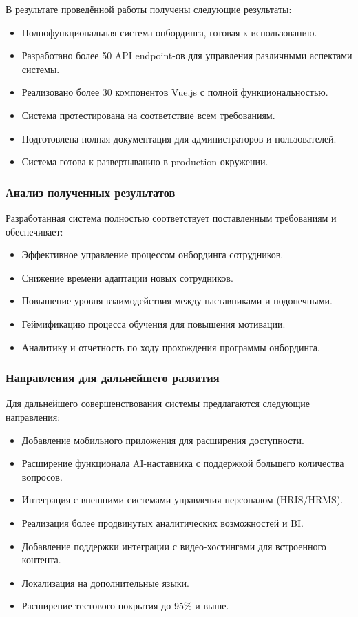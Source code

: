 
В результате проведённой работы получены следующие результаты:
\begin{itemize}
	\item Полнофункциональная система онбординга, готовая к использованию.
	\item Разработано более 50 API endpoint-ов для управления различными аспектами системы.
	\item Реализовано более 30 компонентов Vue.js с полной функциональностью.
	\item Система протестирована на соответствие всем требованиям.
	\item Подготовлена полная документация для администраторов и пользователей.
	\item Система готова к развертыванию в production окружении.
\end{itemize}


\subsubsection*{Анализ полученных результатов}

Разработанная система полностью соответствует поставленным требованиям и обеспечивает:
\begin{itemize}
	\item Эффективное управление процессом онбординга сотрудников.
	\item Снижение времени адаптации новых сотрудников.
	\item Повышение уровня взаимодействия между наставниками и подопечными.
	\item Геймификацию процесса обучения для повышения мотивации.
	\item Аналитику и отчетность по ходу прохождения программы онбординга.
\end{itemize}

\subsubsection*{Направления для дальнейшего развития}

Для дальнейшего совершенствования системы предлагаются следующие направления:
\begin{itemize}
	\item Добавление мобильного приложения для расширения доступности.
	\item Расширение функционала AI-наставника с поддержкой большего количества вопросов.
	\item Интеграция с внешними системами управления персоналом (HRIS/HRMS).
	\item Реализация более продвинутых аналитических возможностей и BI.
	\item Добавление поддержки интеграции с видео-хостингами для встроенного контента.
	\item Локализация на дополнительные языки.
	\item Расширение тестового покрытия до 95\% и выше.
\end{itemize}

